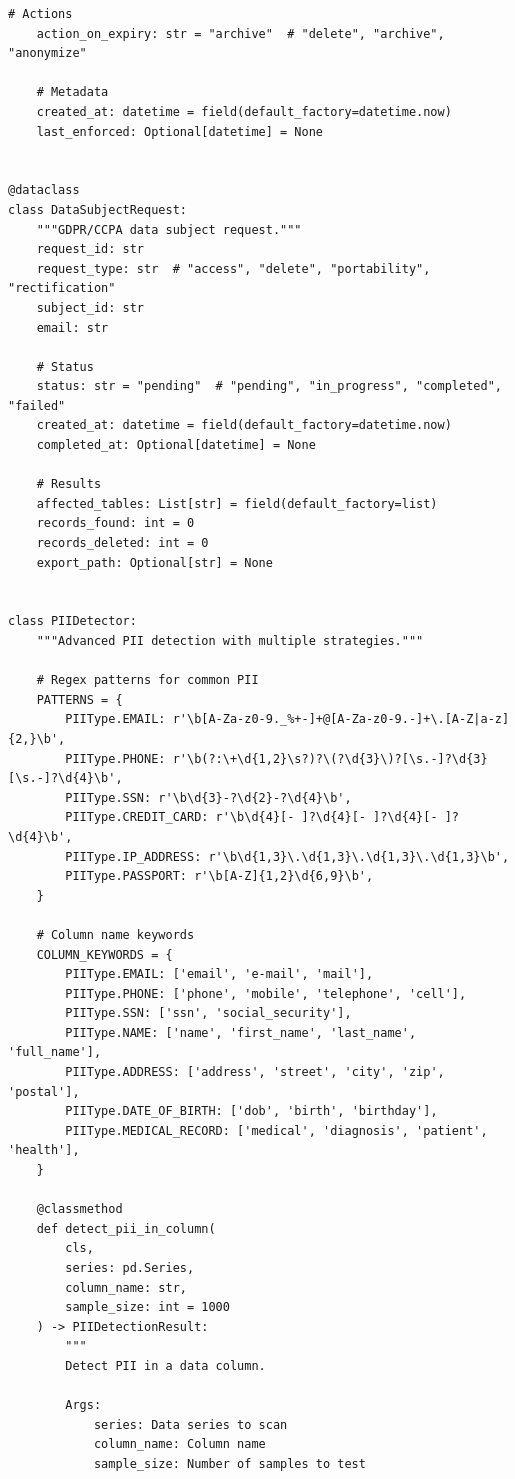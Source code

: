 \begin{lstlisting}[style=python, caption={Comprehensive data privacy compliance framework}]
    # Actions
    action_on_expiry: str = "archive"  # "delete", "archive", "anonymize"

    # Metadata
    created_at: datetime = field(default_factory=datetime.now)
    last_enforced: Optional[datetime] = None


@dataclass
class DataSubjectRequest:
    """GDPR/CCPA data subject request."""
    request_id: str
    request_type: str  # "access", "delete", "portability", "rectification"
    subject_id: str
    email: str

    # Status
    status: str = "pending"  # "pending", "in_progress", "completed", "failed"
    created_at: datetime = field(default_factory=datetime.now)
    completed_at: Optional[datetime] = None

    # Results
    affected_tables: List[str] = field(default_factory=list)
    records_found: int = 0
    records_deleted: int = 0
    export_path: Optional[str] = None


class PIIDetector:
    """Advanced PII detection with multiple strategies."""

    # Regex patterns for common PII
    PATTERNS = {
        PIIType.EMAIL: r'\b[A-Za-z0-9._%+-]+@[A-Za-z0-9.-]+\.[A-Z|a-z]{2,}\b',
        PIIType.PHONE: r'\b(?:\+\d{1,2}\s?)?\(?\d{3}\)?[\s.-]?\d{3}[\s.-]?\d{4}\b',
        PIIType.SSN: r'\b\d{3}-?\d{2}-?\d{4}\b',
        PIIType.CREDIT_CARD: r'\b\d{4}[- ]?\d{4}[- ]?\d{4}[- ]?\d{4}\b',
        PIIType.IP_ADDRESS: r'\b\d{1,3}\.\d{1,3}\.\d{1,3}\.\d{1,3}\b',
        PIIType.PASSPORT: r'\b[A-Z]{1,2}\d{6,9}\b',
    }

    # Column name keywords
    COLUMN_KEYWORDS = {
        PIIType.EMAIL: ['email', 'e-mail', 'mail'],
        PIIType.PHONE: ['phone', 'mobile', 'telephone', 'cell'],
        PIIType.SSN: ['ssn', 'social_security'],
        PIIType.NAME: ['name', 'first_name', 'last_name', 'full_name'],
        PIIType.ADDRESS: ['address', 'street', 'city', 'zip', 'postal'],
        PIIType.DATE_OF_BIRTH: ['dob', 'birth', 'birthday'],
        PIIType.MEDICAL_RECORD: ['medical', 'diagnosis', 'patient', 'health'],
    }

    @classmethod
    def detect_pii_in_column(
        cls,
        series: pd.Series,
        column_name: str,
        sample_size: int = 1000
    ) -> PIIDetectionResult:
        """
        Detect PII in a data column.

        Args:
            series: Data series to scan
            column_name: Column name
            sample_size: Number of samples to test


\end{lstlisting}
